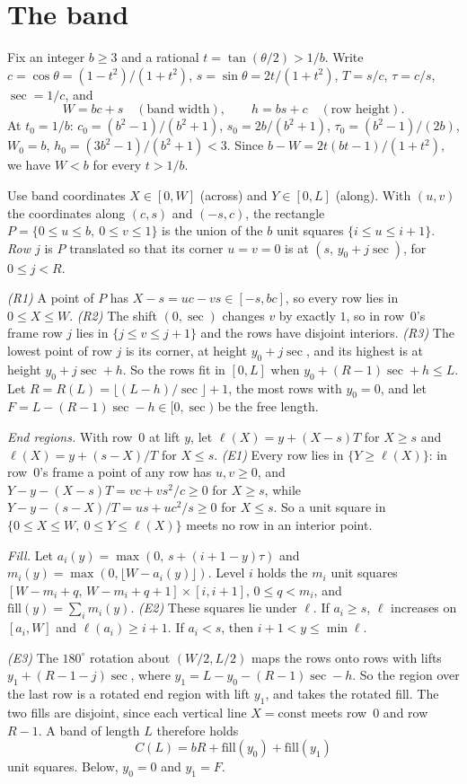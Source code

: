 \documentclass[11pt,letterpaper]{amsart}
\theoremstyle{plain}
\theoremstyle{remark}
\newcommand{\fl}[1]{\lfloor #1 \rfloor}
\begin{document}
\section{The band}\label{sec:band}

Fix an integer $b\ge3$ and a rational $t=\tan(\theta/2)>1/b$. Write $c=\cos\theta=(1-t^2)/(1+t^2)$, $s=\sin\theta=2t/(1+t^2)$, $T=s/c$, $\tau=c/s$, $\sec=1/c$, and
\[
W=bc+s\quad(\text{band width}),\qquad h=bs+c\quad(\text{row height}).
\]
At $t_0=1/b$: $c_0=(b^2-1)/(b^2+1)$, $s_0=2b/(b^2+1)$, $\tau_0=(b^2-1)/(2b)$, $W_0=b$, $h_0=(3b^2-1)/(b^2+1)<3$. Since $b-W=2t(bt-1)/(1+t^2)$, we have $W<b$ for every $t>1/b$.

Use band coordinates $X\in[0,W]$ (across) and $Y\in[0,L]$ (along). With $(u,v)$ the coordinates along $(c,s)$ and $(-s,c)$, the rectangle $P=\{0\le u\le b,\ 0\le v\le1\}$ is the union of the $b$ unit squares $\{i\le u\le i+1\}$. \emph{Row $j$} is $P$ translated so that its corner $u=v=0$ is at $(s,\,y_0+j\sec)$, for $0\le j<R$.

\emph{(R1)} A point of $P$ has $X-s=uc-vs\in[-s,bc]$, so every row lies in $0\le X\le W$. \emph{(R2)} The shift $(0,\sec)$ changes $v$ by exactly $1$, so in row~$0$'s frame row $j$ lies in $\{j\le v\le j+1\}$ and the rows have disjoint interiors. \emph{(R3)} The lowest point of row $j$ is its corner, at height $y_0+j\sec$, and its highest is at height $y_0+j\sec+h$. So the rows fit in $[0,L]$ when $y_0+(R-1)\sec+h\le L$. Let $R=R(L)=\fl{(L-h)/\sec}+1$, the most rows with $y_0=0$, and let $F=L-(R-1)\sec-h\in[0,\sec)$ be the free length.

\emph{End regions.} With row~$0$ at lift $y$, let $\ell(X)=y+(X-s)T$ for $X\ge s$ and $\ell(X)=y+(s-X)/T$ for $X\le s$. \emph{(E1)} Every row lies in $\{Y\ge\ell(X)\}$: in row~$0$'s frame a point of any row has $u,v\ge0$, and $Y-y-(X-s)T=vc+vs^2/c\ge0$ for $X\ge s$, while $Y-y-(s-X)/T=us+uc^2/s\ge0$ for $X\le s$. So a unit square in $\{0\le X\le W,\ 0\le Y\le\ell(X)\}$ meets no row in an interior point.

\emph{Fill.} Let $a_i(y)=\max(0,\,s+(i+1-y)\tau)$ and $m_i(y)=\max(0,\fl{W-a_i(y)})$. Level $i$ holds the $m_i$ unit squares $[W-m_i+q,\,W-m_i+q+1]\times[i,i+1]$, $0\le q<m_i$, and $\mathrm{fill}(y)=\sum_i m_i(y)$. \emph{(E2)} These squares lie under $\ell$. If $a_i\ge s$, $\ell$ increases on $[a_i,W]$ and $\ell(a_i)\ge i+1$. If $a_i<s$, then $i+1<y\le\min\ell$.

\emph{(E3)} The $180^\circ$ rotation about $(W/2,L/2)$ maps the rows onto rows with lifts $y_1+(R-1-j)\sec$, where $y_1=L-y_0-(R-1)\sec-h$. So the region over the last row is a rotated end region with lift $y_1$, and takes the rotated fill. The two fills are disjoint, since each vertical line $X=\mathrm{const}$ meets row~$0$ and row $R-1$. A band of length $L$ therefore holds
\[
C(L)=bR+\mathrm{fill}(y_0)+\mathrm{fill}(y_1)
\]
unit squares. Below, $y_0=0$ and $y_1=F$.
\end{document}
